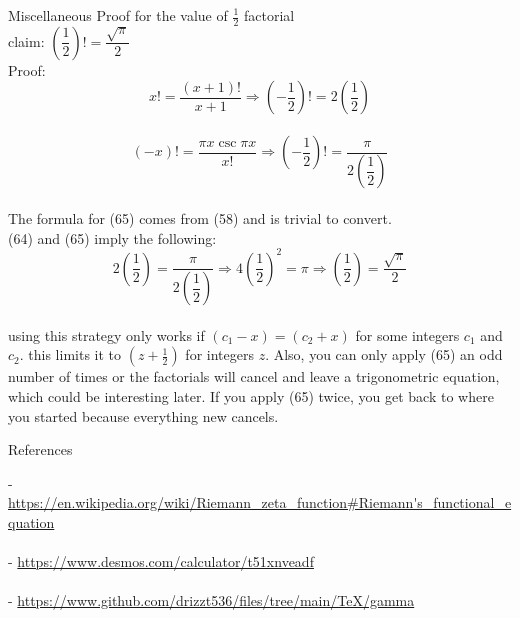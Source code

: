 \documentclass[12pt]{article}
\begin{document}
\begin{section}{Miscellaneous}
	\noindent Proof for the value of $\frac12$ factorial\\
	claim: $\left(\dfrac12\right)!=\dfrac{\sqrt\pi}2$\\
	Proof:\\
	\begin{equation}
		x!=\dfrac{(x+1)!}{x+1}\Longrightarrow\left(-\dfrac12\right)!=2\left(\dfrac12\right)
	\end{equation}\\
	\begin{equation}
		(-x)!=\dfrac{\pi x\csc\pi x}{x!}\Longrightarrow\left(-\dfrac12\right)!=\dfrac\pi{2\left(\dfrac12\right)}
	\end{equation}\\
	The formula for (65) comes from (58) and is trivial to convert.\\
	(64) and (65) imply the following:\\
	\begin{equation}
		2\left(\dfrac12\right)=\dfrac\pi{2\left(\dfrac12\right)}\Longrightarrow4\left(\dfrac12\right)^2=\pi\Longrightarrow\left(\dfrac12\right)=\dfrac{\sqrt\pi}2
	\end{equation}\\
	using this strategy only works if $(c_1-x)=(c_2+x)$ for some integers $c_1$ and $c_2$. this limits it to $(z+\frac12)$ for integers $z$. Also, you can only apply (65) an odd number of times or the factorials will cancel and leave a trigonometric equation, which could be interesting later. If you apply (65) twice, you get back to where you started because everything new cancels.\\
	\blacksquare
\end{section}

\pagebreak\begin{section}{References}

	\noindent- \url{https://en.wikipedia.org/wiki/Riemann\_zeta\_function\#Riemann's\_functional\_equation}\\
	\indent{}\\

	\noindent- \url{https://www.desmos.com/calculator/t51xnveadf}\\
	\indent{}\\

	\noindent- \url{https://www.github.com/drizzt536/files/tree/main/TeX/gamma}\\
	\indent{}
\end{section}
\end{document}
